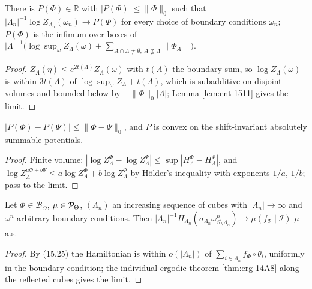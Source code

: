 \begin{theorem}
    \label{thm:pr-15-30}
    \leanok

    There is $P(\Phi) \in \mathbb R$ with $|P(\Phi)| \leq \|\Phi\|_0$ such that
    $|\Lambda_n|^{-1} \log Z_{\Lambda_n}(\omega_n) \to P(\Phi)$ for every choice of boundary
    conditions $\omega_n$; $P(\Phi)$ is the infimum over boxes of
    $|\Lambda|^{-1}\bigl(\log \sup_\omega Z_\Lambda(\omega) + \sum_{A \cap \Lambda \neq \emptyset,\ A \not\subseteq \Lambda}\|\Phi_A\|\bigr)$.
\end{theorem}
\begin{proof}
    \leanok
    $Z_\Lambda(\eta) \leq e^{2 t(\Lambda)} Z_\Lambda(\omega)$ with $t(\Lambda)$ the boundary sum,
    so $\log Z_\Lambda(\omega)$ is within $3 t(\Lambda)$ of
    $\log \sup_\omega Z_\Lambda + t(\Lambda)$, which is subadditive on disjoint volumes and
    bounded below by $-\|\Phi\|_0 |\Lambda|$; Lemma \ref{lem:ent-1511} gives the limit.
\end{proof}

\begin{proposition}[Georgii (16.1)(a)]
    \label{prop:pr-16-1a}
    \leanok

    $|P(\Phi) - P(\Psi)| \leq \|\Phi - \Psi\|_0$, and $P$ is convex on the shift-invariant
    absolutely summable potentials.
\end{proposition}
\begin{proof}
    \leanok
    Finite volume: $|\log Z^\Phi_\Lambda - \log Z^\Psi_\Lambda| \leq \sup|H^\Phi_\Lambda - H^\Psi_\Lambda|$,
    and $\log Z^{a\Phi + b\Psi}_\Lambda \leq a \log Z^\Phi_\Lambda + b \log Z^\Psi_\Lambda$ by
    Hölder's inequality with exponents $1/a$, $1/b$; pass to the limit.
\end{proof}

\begin{remark}[Georgii (15.26)(1)]
    \label{rem:pr-15-26}
    \leanok

    Let $\Phi \in \mathcal B_\Theta$, $\mu \in \mathcal{P}_\Theta$, $(\Lambda_n)$ an increasing sequence
    of cubes with $|\Lambda_n| \to \infty$ and $\omega^n$ arbitrary boundary conditions. Then
    $|\Lambda_n|^{-1} H_{\Lambda_n}(\sigma_{\Lambda_n}\omega^n_{S\setminus\Lambda_n}) \to
    \mu(f_\Phi \mid \mathcal I)$ $\mu$-a.s.
\end{remark}
\begin{proof}
    \leanok
    By (15.25) the Hamiltonian is within $o(|\Lambda_n|)$ of $\sum_{i \in \Lambda_n} f_\Phi\circ\theta_i$,
    uniformly in the boundary condition; the individual ergodic theorem \ref{thm:erg-14A8} along
    the reflected cubes gives the limit.
\end{proof}
